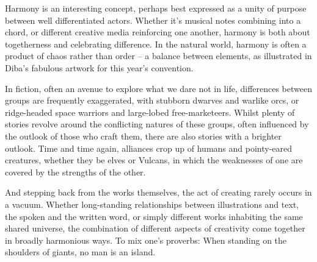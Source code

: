 Harmony is an interesting concept, perhaps best expressed as a unity of purpose between well differentiated actors. Whether it's musical notes combining into a chord, or different creative media reinforcing one another, harmony is both about togetherness and celebrating difference. In the natural world, harmony is often a product of chaos rather than order – a balance between elements, as illustrated in Diba's fabulous artwork for this year's convention.

In fiction, often an avenue to explore what we dare not in life, differences between groups are frequently exaggerated, with stubborn dwarves and warlike orcs, or ridge-headed space warriors and large-lobed free-marketeers. Whilst plenty of stories revolve around the conflicting natures of these groups, often influenced by the outlook of those who craft them, there are also stories with a brighter outlook. Time and time again, alliances crop up of humans and pointy-eared creatures, whether they be elves or Vulcans, in which the weaknesses of one are covered by the strengths of the other.

And stepping back from the works themselves, the act of creating rarely occurs in a vacuum. Whether long-standing relationships between illustrations and text, the spoken and the written word, or simply different works inhabiting the same shared universe, the combination of different aspects of creativity come together in broadly harmonious ways. To mix one's proverbs: When standing on the shoulders of giants, no man is an island.